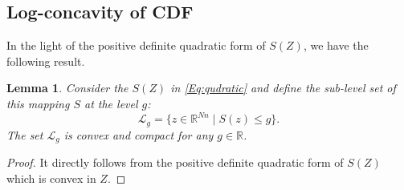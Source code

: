\documentclass[letterpaper, 10 pt, conference]{ieeeconf}  %
\newtheorem{lemma}{Lemma}[section]
\begin{document}
\subsection{Log-concavity of CDF}


In the light of the positive definite quadratic form of $S(Z)$, we have the following result. 
\begin{lemma}\label{Coro:convexlevelset}
Consider the $S(Z)$ in \eqref{Eq:qudratic} and define the sub-level set of this mapping $S$ at the level $g$:
\begin{equation}\label{Eq:levelset}
\mathcal{L}_g = \{ z \in \mathbb{R}^{Nn} \mid S(z) \leq g \}.
\end{equation} 
The set $\mathcal{L}_g$ is convex and compact for any $g\in \mathbb{R}$.
\end{lemma}
\begin{proof}
It directly follows from the positive definite quadratic form of $S(Z)$ which is convex in $Z$. 
\end{proof}
\end{document}
